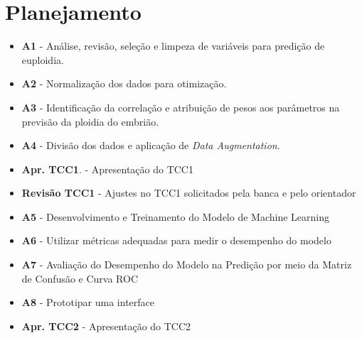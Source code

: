 \chapter[Planejamento]{Planejamento}

\begin{itemize}
    \item \textbf{A1} - Análise, revisão, seleção e limpeza de variáveis para predição de euploidia.
    \item \textbf{A2} - Normalização dos dados para otimização.
    \item \textbf{A3} - Identificação da correlação e atribuição de pesos aos parâmetros na previsão da ploidia do embrião.
    \item \textbf{A4} - Divisão dos dados e aplicação de \textit{Data Augmentation}.
    \item \textbf{Apr. TCC1}. - Apresentação do TCC1
    \item \textbf{Revisão TCC1} - Ajustes no TCC1 solicitados pela banca e pelo orientador
    \item \textbf{A5} - Desenvolvimento e Treinamento do Modelo de Machine Learning
    \item \textbf{A6} - Utilizar métricas adequadas para medir o desempenho do modelo 
    \item \textbf{A7} - Avaliação do Desempenho do Modelo na Predição por meio da Matriz de Confusão e Curva ROC
    \item \textbf{A8} - Prototipar uma interface
    \item \textbf{Apr. TCC2} - Apresentação do TCC2
\end{itemize}

